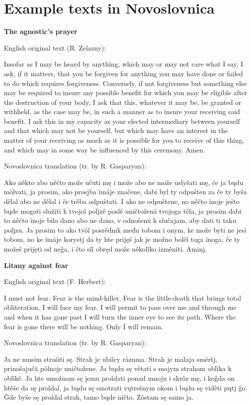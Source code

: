 \section{Example texts in Novoslovnica}


\textbf{The agnostic’s prayer}

English original text (R. Zelazny):

Insofar as I may be heard by anything, which may or may not care what I say, I ask, if it matters, that you be forgiven for anything you may have done or failed to do which requires forgiveness. Conversely, if not forgiveness but something else may be required to insure any possible benefit for which you may be eligible after the destruction of your body, I ask that this, whatever it may be, be granted or withheld, as the case may be, in such a manner as to insure your receiving said benefit. I ask this in my capacity as your elected intermediary between yourself and that which may not be yourself, but which may have an interest in the matter of your receiving as much as it is possible for you to receive of this thing, and which may in some way be influenced by this ceremony. Amen.


Novoslovnica translation (tr. by R. Gasparyan):

Ako někto abo něčto može učuti mę i može abo ne može uslyšati mę, če ja bųdu mòlvati, ja prosim, ako prosjba ïmáje značene, dabi byl ty odpušten za če ty byša dělal abo ne dělal i če trěba odpuštati. I ako ne odpuštene, no něčto ïnoje ješto bųde mogati služiti k tvojoǐ poljzě poslě uničtoženä tvojoga těla, ja prosim dabi to něčto ïnoje bilo dano abo ne dano, v odnošenü k slučajam, aby dati ti taku poljzu. Ja prosim to ako tvôǐ posrědnik među tobom i onym, ke može byti ne jesi tobom, no ke ïmáje korystj da ty hte prijęš jak je možno bolëǐ toga ïnoga, če ty možeš prijęti od neĝa, i čto sïǐ obręd može několïko izměniti. Aminj.

\textbf{Litany against fear}

English original text (F. Herbert):

I must not fear.
Fear is the mind-killer.
Fear is the little-death that brings total obliteration.
I will face my fear.
I will permit to pass over me and through me and when it has gone past I will turn the inner eye to see its path.
Where the fear is gone there will be nothing.
Only I will remain. 

Novoslovnica translation (tr. by R. Gasparyan):

Ja ne musim strašiti sę.
Strah je ubiǐcy råzuma.
Strah je malaja smërtj, prinošajučä pòlnoje uničtožene.
Ja bųdu sę větati s mojym strahom oblïka k oblïkě.
Ja hte umožnam sę jemu proǐdati ponad mnoju i skrôz mę, i koĝda on htěše da sę proǐdal, ja bųdu sę smotrati vųtrešnym okom i bųdu sę viděti pųtj ĝo.
Ĝde byše sę proǐdal strah, tamo bųde ničto.
Zôstam sę samo ja.


